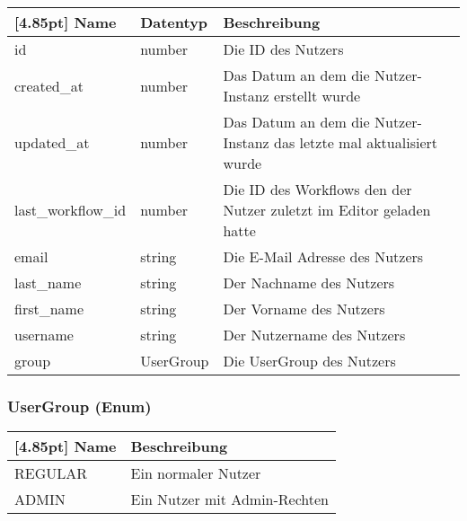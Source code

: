            \begin{center}
            	\renewcommand{\arraystretch}{1.5}
                \setlength\tabcolsep{5pt}
            	\begin{tabularx}{\textwidth}{|l|l|X|}
            		\hline
                    \rowcolor[gray]{0.75}[4.85pt]            		
            	    Name & Datentyp & Beschreibung \\ \hline
                    id & number & Die ID des Nutzers \\ \hline
                    created\_at & number & Das Datum an dem die Nutzer-Instanz erstellt wurde \\ \hline
                    updated\_at & number & Das Datum an dem die Nutzer-Instanz das letzte mal aktualisiert wurde\\ \hline
                    last\_workflow\_id & number & Die ID des Workflows den der Nutzer zuletzt im Editor geladen hatte \\ \hline
                    email & string & Die E-Mail Adresse des Nutzers \\ \hline
                    last\_name & string & Der Nachname des Nutzers\\ \hline
                    first\_name & string & Der Vorname des Nutzers\\ \hline
                    username & string & Der Nutzername des Nutzers\\ \hline
                    group & UserGroup & Die UserGroup des Nutzers\\ \hline    		
            	\end{tabularx}
            \end{center}
                
    		\subsubsection{UserGroup (Enum)}
    		
    		\begin{center}
            	\renewcommand{\arraystretch}{1.5}
	            \setlength\tabcolsep{5pt}
            	\begin{tabularx}{\textwidth}{|l|X|}
            		\hline
                    \rowcolor[gray]{0.75}[4.85pt]
            	    Name & Beschreibung \\ \hline
            		REGULAR & Ein normaler Nutzer \\ \hline
            		ADMIN & Ein Nutzer mit Admin-Rechten \\ \hline
            	\end{tabularx}
            \end{center}
    
